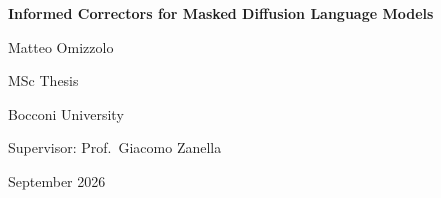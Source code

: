 \documentclass[12pt, a4paper]{report}
\begin{document}
\begin{titlepage}
  \centering
  \vspace*{2cm}
  {\Large\bfseries Informed Correctors for Masked Diffusion Language Models\par}
  \vspace{1.5cm}
  {\large Matteo Omizzolo\par}
  \vspace{0.5cm}
  {\normalsize MSc Thesis\par
   Bocconi University\par
   Supervisor: Prof.\ Giacomo Zanella\par}
  \vspace{1cm}
  {\normalsize September 2026\par}
  \vfill
\end{titlepage}



\tableofcontents
\newpage












\printbibliography[title={Bibliography}]
\end{document}
